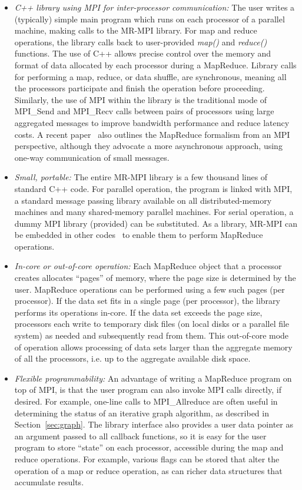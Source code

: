 \begin{itemize}

\item {\it C++ library using MPI for inter-processor communication:}
The user writes a (typically) simple main program which runs on each
processor of a parallel machine, making calls to the MR-MPI library.
For map and reduce operations, the library calls back to user-provided
{\it map()} and {\it reduce()} functions.  The use of C++ allows
precise control over the memory and format of data allocated by each
processor during a MapReduce.  Library calls for performing a map,
reduce, or data shuffle, are synchronous, meaning all the processors
participate and finish the operation before proceeding.  Similarly,
the use of MPI within the library is the traditional mode of MPI\_Send
and MPI\_Recv calls between pairs of processors using large aggregated
messages to improve bandwidth performance and reduce latency costs.  A
recent paper~\cite{Hoefler09} also outlines the MapReduce formalism
from an MPI perspective, although they advocate a more asynchronous
approach, using one-way communication of small messages.

\item {\it Small, portable:} The entire MR-MPI library is a few
thousand lines of standard C++ code.  For parallel operation, the
program is linked with MPI, a standard message passing library
available on all distributed-memory machines and many shared-memory
parallel machines.  For serial operation, a dummy MPI library
(provided) can be substituted.  As a library, MR-MPI can be embedded
in other codes~\cite{Titan} to enable them to perform MapReduce
operations.

\item {\it In-core or out-of-core operation:} Each MapReduce object
that a processor creates allocates ``pages'' of memory, where the page
size is determined by the user.  MapReduce operations can be performed
using a few such pages (per processor).  If the data set fits in a
single page (per processor), the library performs its operations
in-core.  If the data set exceeds the page size, processors each write
to temporary disk files (on local disks or a parallel file system) as
needed and subsequently read from them.  This out-of-core mode of
operation allows processing of data sets larger than the aggregate
memory of all the processors, i.e. up to the aggregate available disk
space.

\item {\it Flexible programmability:} An advantage of writing a
MapReduce program on top of MPI, is that the user program can also
invoke MPI calls directly, if desired.  For example, one-line calls to
MPI\_Allreduce are often useful in determining the status of an
iterative graph algorithm, as described in Section~\ref{sec:graph}.
The library interface also provides a user data pointer as an argument
passed to all callback functions, so it is easy for the user program
to store ``state'' on each processor, accessible during the map and
reduce operations.  For example, various flags can be stored that
alter the operation of a map or reduce operation, as can richer data
structures that accumulate results.


\end{itemize}
